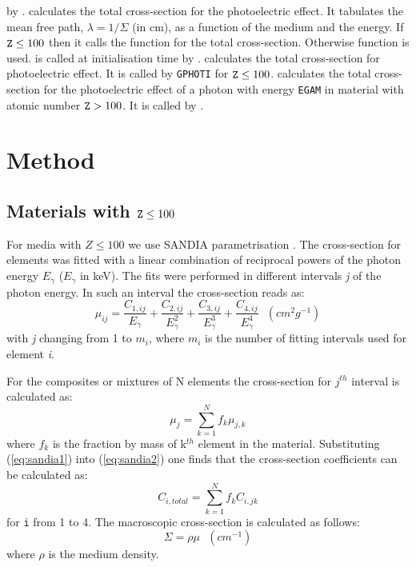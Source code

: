 by .
 calculates the total cross-section for the photoelectric
effect. It tabulates the mean free path, $\lambda = 1/\Sigma$
(in cm), as a function of the medium and the energy.
If  ${\tt Z} \leq  100$ then it calls the function  for the total
cross-section. Otherwise  function is used.
 is called at initialisation time by .
 calculates the total cross-section for photoelectric effect.
It is called by {\tt GPHOTI} for ${\tt Z} \leq  100$.
 calculates the total cross-section for
the photoelectric effect  of a photon with energy {\tt EGAM} in material
with atomic number ${\tt Z} > 100$.  It is called by .
 
\section{Method}
 
\subsection{Materials with ${\tt Z} \leq 100$}
For media with $Z \leq 100$
we use SANDIA parametrisation \cite{bib-SANDIA}.
The cross-section for elements
was fitted with a linear combination of reciprocal powers of the photon
energy $E_\gamma$ ($E_\gamma$ in keV). The fits were performed in different
intervals {\it j} of the photon energy. In such an interval the cross-section
reads as:
\begin{equation}
 \mu_{ij}  =  \frac{C_{1,ij}}{E_\gamma}+\frac{C_{2,ij}}{E_\gamma^2}
            +\frac{C_{3,ij}}{E_\gamma^3}+\frac{C_{4,ij}}{E_\gamma^4}
             \ \ \  (cm^{2}g^{-1})
\label{eq:sandia1}
\end{equation}
with {\it j} changing from 1 to $m_i$,
where $m_i$ is the number of fitting intervals used for element {\it i}.\\
\par
For the composites or mixtures of N elements the cross-section for $j^{th}$
interval is calculated as:
\begin{equation}
 \mu_{j}  =  \sum_{k=1}^{N} f_k \mu_{j,k}
\label{eq:sandia2}
\end{equation}
where $f_k$ is the fraction by mass of k$^{th}$ element in the material.
Substituting (\ref{eq:sandia1}) into (\ref{eq:sandia2}) one finds that
the cross-section coefficients can be calculated as:
\begin{equation}
 C_{i,total}  =  \sum_{k=1}^{N} f_k C_{i,jk}
\label{eq:sandia3}
\end{equation}
for {\tt i} from 1 to 4.
The macroscopic cross-section is calculated as follows:
\begin{equation}
 \Sigma  =  \rho\mu \ \ \ (cm^{-1})
\end{equation}
where $\rho$ is the medium density.
 
